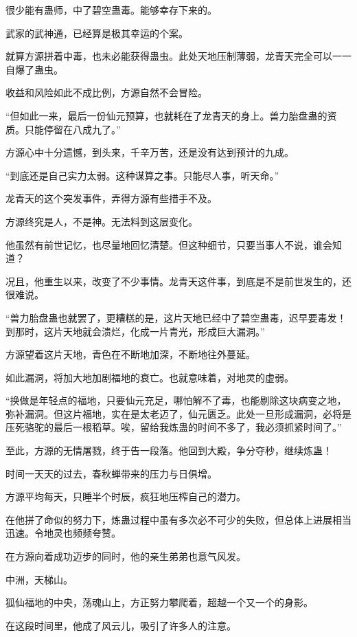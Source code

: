 \begin{this_body}
很少能有蛊师，中了碧空蛊毒。能够幸存下来的。

武家的武神通，已经算是极其幸运的个案。

就算方源拼着中毒，也未必能获得蛊虫。此处天地压制薄弱，龙青天完全可以一一自爆了蛊虫。

收益和风险如此不成比例，方源自然不会冒险。

“但如此一来，最后一份仙元预算，也就耗在了龙青天的身上。兽力胎盘蛊的资质。只能停留在八成九了。”

方源心中十分遗憾，到头来，千辛万苦，还是没有达到预计的九成。

“到底还是自己实力太弱。这种谋算之事。只能尽人事，听天命。”

龙青天的这个突发事件，弄得方源有些措手不及。

方源终究是人，不是神。无法料到这层变化。

他虽然有前世记忆，也尽量地回忆清楚。但这种细节，只要当事人不说，谁会知道？

况且，他重生以来，改变了不少事情。龙青天这件事，到底是不是前世发生的，还很难说。

“兽力胎盘蛊也就罢了，更糟糕的是，这片天地已经中了碧空蛊毒，迟早要毒发！到那时，这片天地就会溃烂，化成一片青光，形成巨大漏洞。”

方源望着这片天地，青色在不断地加深，不断地往外蔓延。

如此漏洞，将加大地加剧福地的衰亡。也就意味着，对地灵的虚弱。

“换做是年轻点的福地，只要仙元充足，哪怕解不了毒，也能剔除这块病变之地，弥补漏洞。但这片福地，实在是太老迈了，仙元匮乏。此处一旦形成漏洞，必将是压死骆驼的最后一根稻草。唉，留给我炼蛊的时间不多了，我必须抓紧时间了。”

至此，方源的无情屠戮，终于告一段落。他回到大殿，争分夺秒，继续炼蛊！

时间一天天的过去，春秋蝉带来的压力与日俱增。

方源平均每天，只睡半个时辰，疯狂地压榨自己的潜力。

在他拼了命似的努力下，炼蛊过程中虽有多次必不可少的失败，但总体上进展相当迅速。令地灵也频频夸赞。

在方源向着成功迈步的同时，他的亲生弟弟也意气风发。

中洲，天梯山。

狐仙福地的中央，荡魂山上，方正努力攀爬着，超越一个又一个的身影。

在这段时间里，他成了风云儿，吸引了许多人的注意。


\end{this_body}
